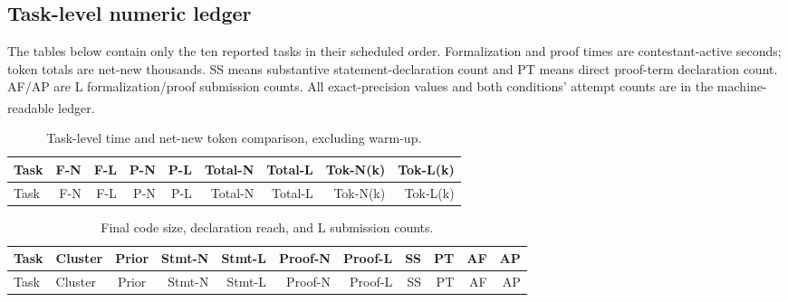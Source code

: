\documentclass[10pt,a4paper]{article}
\newcommand{\src}[1]{\textsuperscript{\cite{#1}}}
\begin{document}
\clearpage
\appendix
\begin{landscape}
\section{Task-level numeric ledger}

The tables below contain only the ten reported tasks in their scheduled
order. Formalization and proof times are contestant-active seconds; token
totals are net-new thousands. SS means substantive statement-declaration
count and PT means direct proof-term declaration count. AF/AP are L
formalization/proof submission counts. All exact-precision values and both
conditions' attempt counts are in the machine-readable ledger.
\src{taskledger,plotcode}

\small
\begin{longtable}{@{}lrrrrrrrr@{}}
\caption{Task-level time and net-new token comparison, excluding warm-up.
\cite{taskledger,plotcode}}\label{tab:times}\\
\toprule Task & F-N & F-L & P-N & P-L & Total-N & Total-L & Tok-N(k) & Tok-L(k)\\\midrule\endfirsthead
\toprule Task & F-N & F-L & P-N & P-L & Total-N & Total-L & Tok-N(k) & Tok-L(k)\\\midrule\endhead

\end{longtable}
\vspace{3mm}
\begin{longtable}{@{}llcrrrrrrrr@{}}
\caption{Final code size, declaration reach, and L submission counts.
\cite{taskledger,declscan,plotcode}}\label{tab:code}\\
\toprule Task & Cluster & Prior & Stmt-N & Stmt-L & Proof-N & Proof-L & SS & PT & AF & AP\\\midrule\endfirsthead
\toprule Task & Cluster & Prior & Stmt-N & Stmt-L & Proof-N & Proof-L & SS & PT & AF & AP\\\midrule\endhead

\end{longtable}
\end{landscape}
\end{document}
